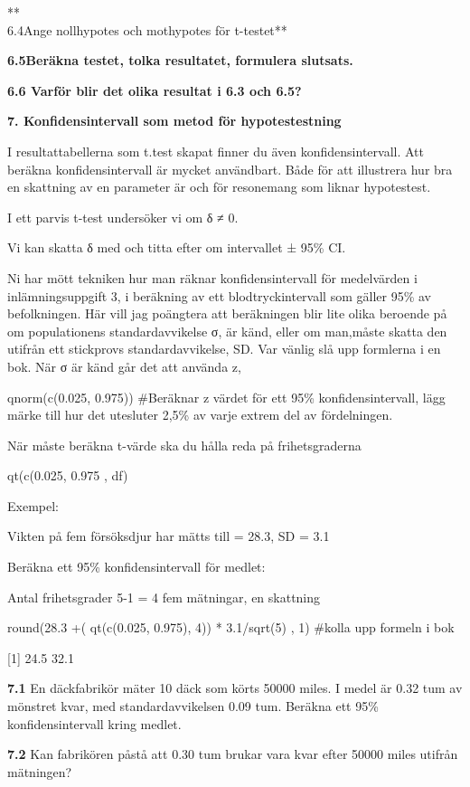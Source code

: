 \documentclass[
  letterpaper,
  DIV=11,
  numbers=noendperiod]{scrartcl}
\begin{document}
**\\
6.4Ange nollhypotes och mothypotes för t-testet**

\textbf{6.5Beräkna testet, tolka resultatet, formulera slutsats.}

\textbf{6.6 Varför blir det olika resultat i 6.3 och 6.5?}

\textbf{7. Konfidensintervall som metod för hypotestestning}

I resultattabellerna som t.test skapat finner du även
konfidensintervall. Att beräkna konfidensintervall är mycket användbart.
Både för att illustrera hur bra en skattning av en parameter är och för
resonemang som liknar hypotestest.

I ett parvis t-test undersöker vi om δ ≠ 0.

Vi kan skatta δ med och titta efter om intervallet ± 95\% CI.

Ni har mött tekniken hur man räknar konfidensintervall för medelvärden i
inlämningsuppgift 3, i beräkning av ett blodtryckintervall som gäller
95\% av befolkningen. Här vill jag poängtera att beräkningen blir lite
olika beroende på om populationens standardavvikelse σ, är känd, eller
om man,måste skatta den utifrån ett stickprovs standardavvikelse, SD.
Var vänlig slå upp formlerna i en bok. När σ är känd går det att använda
z,

qnorm(c(0.025, 0.975)) \#Beräknar z värdet för ett 95\%
konfidensintervall, lägg märke till hur det utesluter 2,5\% av varje
extrem del av fördelningen.

När måste beräkna t-värde ska du hålla reda på frihetsgraderna

qt(c(0.025, 0.975 , df)

Exempel:

Vikten på fem försöksdjur har mätts till = 28.3, SD = 3.1

Beräkna ett 95\% konfidensintervall för medlet:

Antal frihetsgrader 5-1 = 4 fem mätningar, en skattning

round(28.3 +( qt(c(0.025, 0.975), 4)) * 3.1/sqrt(5) , 1) \#kolla upp
formeln i bok

{[}1{]} 24.5 32.1

\textbf{7.1} En däckfabrikör mäter 10 däck som körts 50000 miles. I
medel är 0.32 tum av mönstret kvar, med standardavvikelsen 0.09 tum.
Beräkna ett 95\% konfidensintervall kring medlet.

\textbf{7.2} Kan fabrikören påstå att 0.30 tum brukar vara kvar efter
50000 miles utifrån mätningen?
\end{document}
